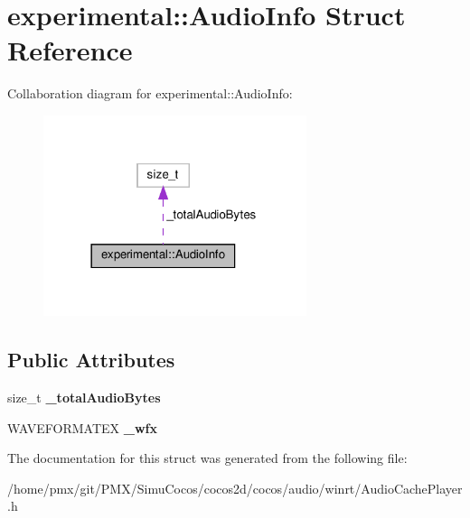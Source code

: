 \hypertarget{structexperimental_1_1AudioInfo}{}\section{experimental\+:\+:Audio\+Info Struct Reference}
\label{structexperimental_1_1AudioInfo}


Collaboration diagram for experimental\+:\+:Audio\+Info\+:
\nopagebreak
\begin{figure}[H]
\begin{center}
\leavevmode
\includegraphics[width=218pt]{structexperimental_1_1AudioInfo__coll__graph}
\end{center}
\end{figure}
\subsection*{Public Attributes}
\begin{DoxyCompactItemize}
\item 
\mbox{\label{structexperimental_1_1AudioInfo_a5a7ca6fe41fee11da01fa0fc1e1b846b}} 
size\+\_\+t {\bfseries \+\_\+total\+Audio\+Bytes}
\item 
\mbox{\label{structexperimental_1_1AudioInfo_ad2c9f9c7261ae149aa08bfcaabc0e4ac}} 
W\+A\+V\+E\+F\+O\+R\+M\+A\+T\+EX {\bfseries \+\_\+wfx}
\end{DoxyCompactItemize}


The documentation for this struct was generated from the following file\+:\begin{DoxyCompactItemize}
\item 
/home/pmx/git/\+P\+M\+X/\+Simu\+Cocos/cocos2d/cocos/audio/winrt/Audio\+Cache\+Player.\+h\end{DoxyCompactItemize}
